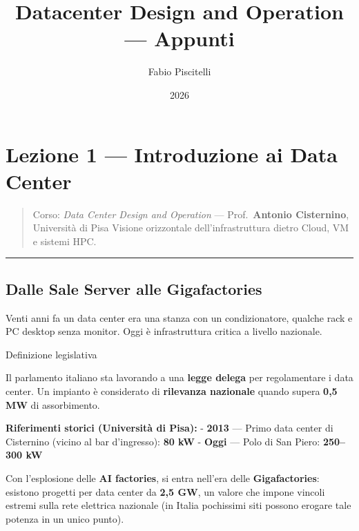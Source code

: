 \documentclass[
  italian,
  openany]{book}
\title{Datacenter Design and Operation --- Appunti}
\author{Fabio Piscitelli}
\date{2026}
\begin{document}
\frontmatter
\maketitle

{
\setcounter{tocdepth}{1}
\tableofcontents
}
\mainmatter
\chapter{Lezione 1 --- Introduzione ai Data
Center}\label{lezione-1-introduzione-ai-data-center}

\begin{quote}
Corso: \emph{Data Center Design and Operation} --- Prof.~\textbf{Antonio
Cisternino}, Università di Pisa Visione orizzontale dell'infrastruttura
dietro Cloud, VM e sistemi HPC.
\end{quote}

\begin{center}\rule{0.5\linewidth}{0.5pt}\end{center}

\section{Dalle Sale Server alle
Gigafactories}\label{dalle-sale-server-alle-gigafactories}

Venti anni fa un data center era una stanza con un condizionatore,
qualche rack e PC desktop senza monitor. Oggi è infrastruttura critica a
livello nazionale.

\begin{calloutnote}{Definizione legislativa}

Il parlamento italiano sta lavorando a una \textbf{legge delega} per
regolamentare i data center. Un impianto è considerato di
\textbf{rilevanza nazionale} quando supera \textbf{0,5 MW} di
assorbimento.

\end{calloutnote}

\textbf{Riferimenti storici (Università di Pisa):} - \textbf{2013} ---
Primo data center di Cisternino (vicino al bar d'ingresso): \textbf{80
kW} - \textbf{Oggi} --- Polo di San Piero: \textbf{250--300 kW}

Con l'esplosione delle \textbf{AI factories}, si entra nell'era delle
\textbf{Gigafactories}: esistono progetti per data center da \textbf{2,5
GW}, un valore che impone vincoli estremi sulla rete elettrica nazionale
(in Italia pochissimi siti possono erogare tale potenza in un unico
punto).
\end{document}
